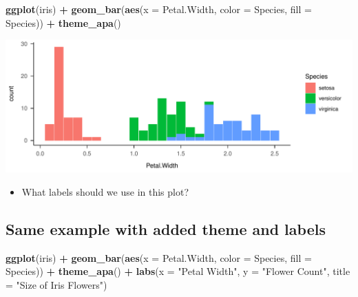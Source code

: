 \documentclass[
]{book}
\newenvironment{Shaded}{\begin{snugshade}}{\end{snugshade}}
\newcommand{\AttributeTok}[1]{\textcolor[rgb]{0.13,0.29,0.53}{#1}}
\newcommand{\FunctionTok}[1]{\textcolor[rgb]{0.13,0.29,0.53}{\textbf{#1}}}
\newcommand{\NormalTok}[1]{#1}
\newcommand{\SpecialCharTok}[1]{\textcolor[rgb]{0.81,0.36,0.00}{\textbf{#1}}}
\newcommand{\StringTok}[1]{\textcolor[rgb]{0.31,0.60,0.02}{#1}}
\providecommand{\tightlist}{%
  \setlength{\itemsep}{0pt}\setlength{\parskip}{0pt}}
\begin{document}
\begin{Shaded}
\begin{Highlighting}[]
\FunctionTok{ggplot}\NormalTok{(iris) }\SpecialCharTok{+} 
  \FunctionTok{geom\_bar}\NormalTok{(}\FunctionTok{aes}\NormalTok{(}\AttributeTok{x =}\NormalTok{ Petal.Width, }\AttributeTok{color =}\NormalTok{ Species, }\AttributeTok{fill =}\NormalTok{ Species)) }\SpecialCharTok{+}
  \FunctionTok{theme\_apa}\NormalTok{()}
\end{Highlighting}
\end{Shaded}

\begin{flushleft}\includegraphics{_main_files/figure-latex/unnamed-chunk-53-1} \end{flushleft}

\begin{itemize}
\tightlist
\item
  What labels should we use in this plot?
\end{itemize}

\subsection{Same example with added theme and labels}\label{same-example-with-added-theme-and-labels}

\begin{Shaded}
\begin{Highlighting}[]
\FunctionTok{ggplot}\NormalTok{(iris) }\SpecialCharTok{+} 
  \FunctionTok{geom\_bar}\NormalTok{(}\FunctionTok{aes}\NormalTok{(}\AttributeTok{x =}\NormalTok{ Petal.Width, }\AttributeTok{color =}\NormalTok{ Species, }\AttributeTok{fill =}\NormalTok{ Species)) }\SpecialCharTok{+}
  \FunctionTok{theme\_apa}\NormalTok{() }\SpecialCharTok{+}
  \FunctionTok{labs}\NormalTok{(}\AttributeTok{x =} \StringTok{"Petal Width"}\NormalTok{, }\AttributeTok{y =} \StringTok{"Flower Count"}\NormalTok{,}
       \AttributeTok{title =} \StringTok{"Size of Iris Flowers"}\NormalTok{)}
\end{Highlighting}
\end{Shaded}
\end{document}
